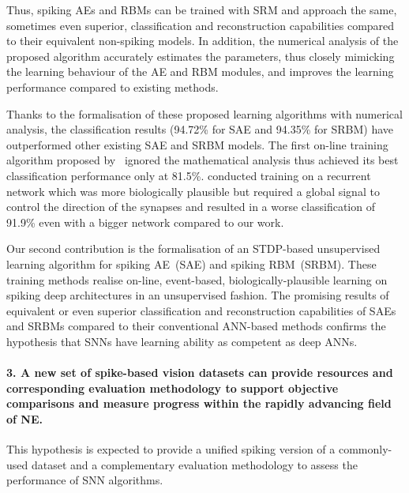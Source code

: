 Thus, spiking AEs and RBMs can be trained with SRM and approach the same, sometimes even superior, classification and reconstruction capabilities compared to their equivalent non-spiking models.
In addition, the numerical analysis of the proposed algorithm accurately estimates the parameters, thus closely mimicking the learning behaviour of the AE and RBM modules, and improves the learning performance compared to existing methods.






Thanks to the formalisation of these proposed learning algorithms with numerical analysis, the classification results (94.72\% for SAE and 94.35\% for SRBM) have outperformed other existing SAE and SRBM models.
The first on-line training algorithm proposed by~\citet{neil2013online} ignored the mathematical analysis thus achieved its best classification performance only at 81.5\%.
\citet{neftci2013event} conducted training on a recurrent network which was more biologically plausible but required a global signal to control the direction of the synapses and resulted in a worse classification of 91.9\% even with a bigger network compared to our work.

Our second contribution is the formalisation of an STDP-based unsupervised learning algorithm for spiking AE~(SAE) and spiking RBM~(SRBM).
These training methods realise on-line, event-based, biologically-plausible learning on spiking deep architectures in an unsupervised fashion.
The promising results of equivalent or even superior classification and reconstruction capabilities of SAEs and SRBMs compared to their conventional ANN-based methods confirms the hypothesis that SNNs have learning ability as competent as deep ANNs.

\paragraph{3. A new set of spike-based vision datasets can provide resources and corresponding evaluation methodology to support objective comparisons and measure progress within the rapidly advancing field of NE.}
This hypothesis is expected to provide a unified spiking version of a commonly-used dataset and a complementary evaluation methodology to assess the performance of SNN algorithms.

